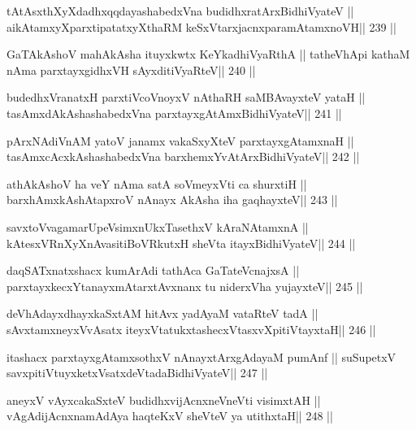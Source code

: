 \begin{shl}
tAtAsxthXyXdadhxqqdayashabedxVna budidhxratArxBidhiVyateV ||
aikAtamxyXparxtipatatxyXthaRM keSxVtarxjacnxparamAtamxnoVH\hfill || 239 ||
\end{shl}

\begin{shl}
GaTAkAshoV mahAkAsha ituyxkwtx KeYkadhiVyaRthA ||
tatheVhApi kathaM nAma parxtayxgidhxVH sAyxditiVyaRteV\hfill || 240 ||
\end{shl}

\begin{shl}
budedhxVranatxH parxtiVcoV\s noyxV nAthaRH saMBAvayxteV yataH ||
tasAmxdAkAshashabedxVna parxtayxgAtAmx\s BidhiVyateV\hfill || 241 ||
\end{shl}

\begin{shl}
pArxNAdiVnAM yatoV janamx vakaSxyXteV parxtayxgAtamxnaH ||
tasAmxcAcx\s\s kAshashabedxVna barxhemxYvAtArxBidhiVyateV\hfill || 242 ||
\end{shl}

\begin{shl}
athA\s\s kAshoV ha veY nAma satA soVmeyxVti ca shurxtiH ||
barxhAmxkAshAtapxroV nAnayx AkAsha iha gaqhayxteV\hfill || 243 ||
\end{shl}

\begin{shl}
savxtoVvagamarUpeV\s simxnUkxTasethxV kAraNAtamxnA ||
kAtesxVRnXyXnAvasitiBoVRkutxH sheVta itayxBidhiVyateV\hfill || 244 ||
\end{shl}

\begin{shl}
daqSATxnatxshacx kumArAdi tathAca GaTateV\s cnajxsA ||
parxtayxkecxYtanayxmAtarxtAvxnanx tu niderxVha yujayxteV\hfill || 245 ||
\end{shl}

\begin{shl}
deVhAdayxdhayxkaSxtAM hitAvx yadA\s yaM vataRteV tadA ||
sAvxtamxneyxVvA\s\s satx iteyxVtatukxtashecxVtasxvXpitiVtayxtaH\hfill || 246 ||
\end{shl}

\begin{shl}
itashacx parxtayxgAtamxsothxV nAnayxtArxgAdayaM pumAnf ||
suSupetxV savxpitiVtuyxketxVsatxdeVtadaBidhiVyateV\hfill || 247 ||
\end{shl}

\begin{shl}
aneyxV vAyxcakaSxteV budidhxvijAcnxneVneVti visimxtAH ||
vAgAdijAcnxnamAdAya haqteKxV sheVteV ya utithxtaH\hfill || 248 ||
\end{shl}

